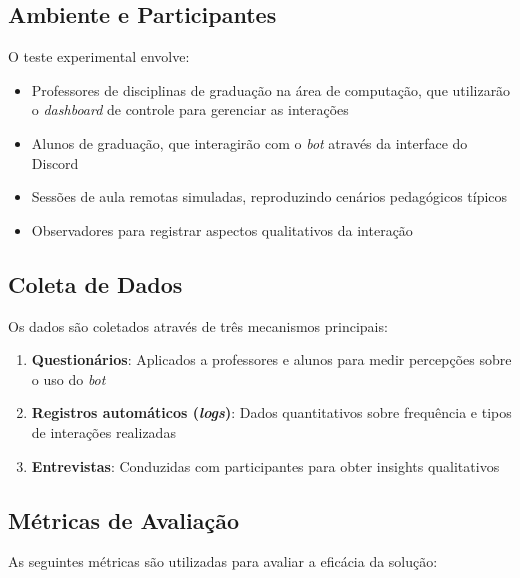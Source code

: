 \subsection{Ambiente e Participantes}
\label{subsec:ambiente}

O teste experimental envolve:
\begin{itemize}
\item Professores de disciplinas de graduação na área de computação, que
utilizarão o \textit{dashboard} de controle para gerenciar as interações
\item Alunos de graduação, que interagirão com o \textit{bot} através da
interface do Discord
\item Sessões de aula remotas simuladas, reproduzindo cenários pedagógicos
típicos
\item Observadores para registrar aspectos qualitativos da interação
\end{itemize}

\subsection{Coleta de Dados}
\label{subsec:coleta}

Os dados são coletados através de três mecanismos principais:

\begin{enumerate}
\item \textbf{Questionários}: Aplicados a professores e alunos para medir
percepções sobre o uso do \textit{bot} 
\item \textbf{Registros automáticos (\textit{logs})}: Dados quantitativos sobre
frequência e tipos de interações realizadas
\item \textbf{Entrevistas}: Conduzidas com participantes para obter insights
qualitativos
\end{enumerate}

\subsection{Métricas de Avaliação}
\label{subsec:metricas}

As seguintes métricas são utilizadas para avaliar a eficácia da solução:

